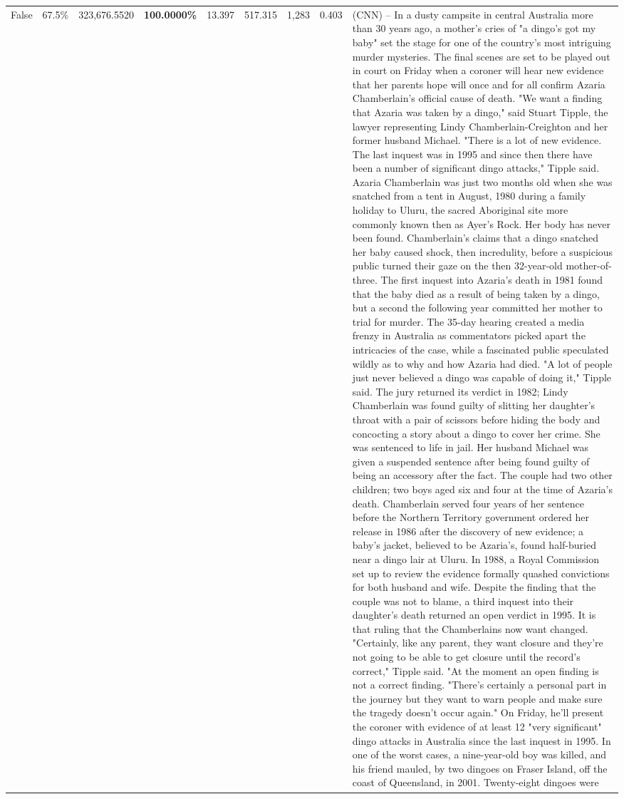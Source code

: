 \begin{table}[H]
\begin{tabular}{lllrlllll}
False & 67.5\% & 323,676.5520 & \bfseries \color{red} 100.0000\% & 13.397 & 517.315 & 1,283 & 0.403 & (CNN) -- In a dusty campsite in central Australia more than 30 years ago, a mother's cries of "a dingo's got my baby" set the stage for one of the country's most intriguing murder mysteries. The final scenes are set to be played out in court on Friday when a coroner will hear new evidence that her parents hope will once and for all confirm Azaria Chamberlain's official cause of death. "We want a finding that Azaria was taken by a dingo," said Stuart Tipple, the lawyer representing Lindy Chamberlain-Creighton and her former husband Michael. "There is a lot of new evidence. The last inquest was in 1995 and since then there have been a number of significant dingo attacks," Tipple said. Azaria Chamberlain was just two months old when she was snatched from a tent in August, 1980 during a family holiday to Uluru, the sacred Aboriginal site more commonly known then as Ayer's Rock. Her body has never been found. Chamberlain's claims that a dingo snatched her baby caused shock, then incredulity, before a suspicious public turned their gaze on the then 32-year-old mother-of-three. The first inquest into Azaria's death in 1981 found that the baby died as a result of being taken by a dingo, but a second the following year committed her mother to trial for murder. The 35-day hearing created a media frenzy in Australia as commentators picked apart the intricacies of the case, while a fascinated public speculated wildly as to why and how Azaria had died. "A lot of people just never believed a dingo was capable of doing it," Tipple said. The jury returned its verdict in 1982; Lindy Chamberlain was found guilty of slitting her daughter's throat with a pair of scissors before hiding the body and concocting a story about a dingo to cover her crime. She was sentenced to life in jail. Her husband Michael was given a suspended sentence after being found guilty of being an accessory after the fact. The couple had two other children; two boys aged six and four at the time of Azaria's death. Chamberlain served four years of her sentence before the Northern Territory government ordered her release in 1986 after the discovery of new evidence; a baby's jacket, believed to be Azaria's, found half-buried near a dingo lair at Uluru. In 1988, a Royal Commission set up to review the evidence formally quashed convictions for both husband and wife. Despite the finding that the couple was not to blame, a third inquest into their daughter's death returned an open verdict in 1995. It is that ruling that the Chamberlains now want changed. "Certainly, like any parent, they want closure and they're not going to be able to get closure until the record's correct," Tipple said. "At the moment an open finding is not a correct finding. "There's certainly a personal part in the journey but they want to warn people and make sure the tragedy doesn't occur again." On Friday, he'll present the coroner with evidence of at least 12 "very significant" dingo attacks in Australia since the last inquest in 1995. In one of the worst cases, a nine-year-old boy was killed, and his friend mauled, by two dingoes on Fraser Island, off the coast of Queensland, in 2001. Twenty-eight dingoes were 
\end{tabular}
\end{table}

